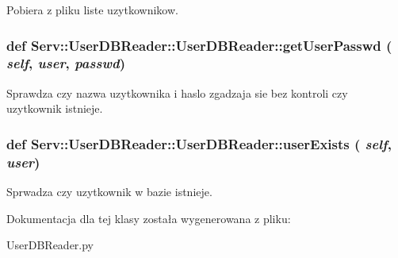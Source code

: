 \label{class_serv_1_1_user_d_b_reader_1_1_user_d_b_reader_a84890922ae8efd8ecec178874ec296f6}
\begin{DoxyVerb}Pobiera z pliku liste uzytkownikow.\end{DoxyVerb}
 \hypertarget{class_serv_1_1_user_d_b_reader_1_1_user_d_b_reader_ad77c35dbbb9ddf154ab8809463a254c0}{
\subsubsection[{getUserPasswd}]{\setlength{\rightskip}{0pt plus 5cm}def Serv::UserDBReader::UserDBReader::getUserPasswd ( {\em self}, \/   {\em user}, \/   {\em passwd})}}
\label{class_serv_1_1_user_d_b_reader_1_1_user_d_b_reader_ad77c35dbbb9ddf154ab8809463a254c0}
\begin{DoxyVerb}Sprawdza czy nazwa uzytkownika i haslo zgadzaja sie bez kontroli czy uzytkownik istnieje.\end{DoxyVerb}
 \hypertarget{class_serv_1_1_user_d_b_reader_1_1_user_d_b_reader_ae3a006e064956d5d09ad1bcaa4c3315f}{
\subsubsection[{userExists}]{\setlength{\rightskip}{0pt plus 5cm}def Serv::UserDBReader::UserDBReader::userExists ( {\em self}, \/   {\em user})}}
\label{class_serv_1_1_user_d_b_reader_1_1_user_d_b_reader_ae3a006e064956d5d09ad1bcaa4c3315f}
\begin{DoxyVerb}Sprwadza czy uzytkownik w bazie istnieje.\end{DoxyVerb}
 

Dokumentacja dla tej klasy została wygenerowana z pliku:\begin{DoxyCompactItemize}
\item 
UserDBReader.py\end{DoxyCompactItemize}
